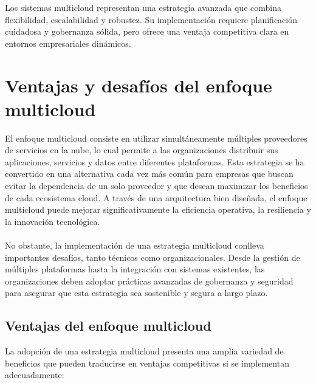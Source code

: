 {        Los sistemas multicloud representan una estrategia avanzada que combina flexibilidad, escalabilidad y robustez. Su implementación requiere planificación cuidadosa y gobernanza sólida, pero ofrece una ventaja competitiva clara en entornos empresariales dinámicos.
    
    \section{Ventajas y desafíos del enfoque multicloud}
        El enfoque multicloud consiste en utilizar simultáneamente múltiples proveedores de servicios en la nube, lo cual permite a las organizaciones distribuir sus aplicaciones, servicios y datos entre diferentes plataformas. Esta estrategia se ha convertido en una alternativa cada vez más común para empresas que buscan evitar la dependencia de un solo proveedor y que desean maximizar los beneficios de cada ecosistema cloud. A través de una arquitectura bien diseñada, el enfoque multicloud puede mejorar significativamente la eficiencia operativa, la resiliencia y la innovación tecnológica.
        
        \paragraph{}No obstante, la implementación de una estrategia multicloud conlleva importantes desafíos, tanto técnicos como organizacionales. Desde la gestión de múltiples plataformas hasta la integración con sistemas existentes, las organizaciones deben adoptar prácticas avanzadas de gobernanza y seguridad para asegurar que esta estrategia sea sostenible y segura a largo plazo.
        
        \subsection{Ventajas del enfoque multicloud}
            La adopción de una estrategia multicloud presenta una amplia variedad de beneficios que pueden traducirse en ventajas competitivas si se implementan adecuadamente:
        
}
